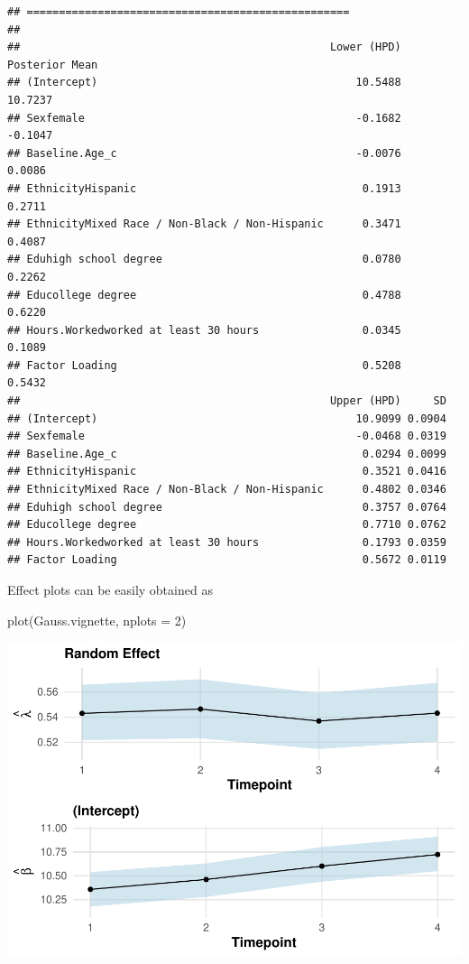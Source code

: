 \documentclass[a4paper, preprint, 3p,
authoryear]{elsarticle} %
\newenvironment{Shaded}{\begin{snugshade}}{\end{snugshade}}
\newcommand{\NormalTok}[1]{#1}
\begin{document}
\begin{verbatim}
## ==================================================
## 
##                                                Lower (HPD) Posterior Mean
## (Intercept)                                        10.5488        10.7237
## Sexfemale                                          -0.1682        -0.1047
## Baseline.Age_c                                     -0.0076         0.0086
## EthnicityHispanic                                   0.1913         0.2711
## EthnicityMixed Race / Non-Black / Non-Hispanic      0.3471         0.4087
## Eduhigh school degree                               0.0780         0.2262
## Educollege degree                                   0.4788         0.6220
## Hours.Workedworked at least 30 hours                0.0345         0.1089
## Factor Loading                                      0.5208         0.5432
##                                                Upper (HPD)     SD
## (Intercept)                                        10.9099 0.0904
## Sexfemale                                          -0.0468 0.0319
## Baseline.Age_c                                      0.0294 0.0099
## EthnicityHispanic                                   0.3521 0.0416
## EthnicityMixed Race / Non-Black / Non-Hispanic      0.4802 0.0346
## Eduhigh school degree                               0.3757 0.0764
## Educollege degree                                   0.7710 0.0762
## Hours.Workedworked at least 30 hours                0.1793 0.0359
## Factor Loading                                      0.5672 0.0119
\end{verbatim}

Effect plots can be easily obtained as

\begin{Shaded}
\begin{Highlighting}[]
\NormalTok{plot(Gauss.vignette, nplots = 2)}
\end{Highlighting}
\end{Shaded}

\includegraphics[width=0.7\linewidth]{Vignette-for-panelTVP_files/figure-latex/myplot-1}
\end{document}
